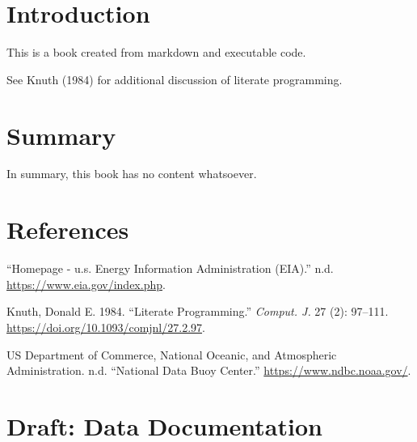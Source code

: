 \documentclass[
  letterpaper,
  DIV=11,
  numbers=noendperiod]{scrreprt}
\newlength{\cslhangindent}
\newlength{\cslentryspacingunit} %
\newenvironment{CSLReferences}[2] %
 {%
  \setlength{\parindent}{0pt}
  \ifodd #1
  \let\oldpar\par
  \def\par{\hangindent=\cslhangindent\oldpar}
  \fi
  \setlength{\parskip}{#2\cslentryspacingunit}
 }%
 {}
\begin{document}

\hypertarget{introduction}{%
\chapter{Introduction}\label{introduction}}

This is a book created from markdown and executable code.

See Knuth (1984) for additional discussion of literate programming.


\hypertarget{summary}{%
\chapter{Summary}\label{summary}}

In summary, this book has no content whatsoever.


\hypertarget{references}{%
\chapter*{References}\label{references}}


\hypertarget{refs}{}
\begin{CSLReferences}{1}{0}
\leavevmode{}%
{``Homepage - u.s. Energy Information Administration (EIA).''} n.d.
\url{https://www.eia.gov/index.php}.

\leavevmode{}%
Knuth, Donald E. 1984. {``Literate Programming.''} \emph{Comput. J.} 27
(2): 97--111. \url{https://doi.org/10.1093/comjnl/27.2.97}.

\leavevmode{}%
US Department of Commerce, National Oceanic, and Atmospheric
Administration. n.d. {``National Data Buoy Center.''}
\url{https://www.ndbc.noaa.gov/}.

\end{CSLReferences}

\cleardoublepage
{}
{}
\appendix

\hypertarget{draft-data-documentation}{%
\chapter{Draft: Data Documentation}\label{draft-data-documentation}}
\end{document}

